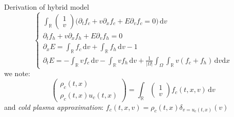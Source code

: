 \documentclass{beamer}
\begin{document}
\begin{frame}{Derivation of hybrid model}
  $$
    \begin{cases}
      \int_\mathbb{R} \begin{pmatrix}1\\v\end{pmatrix} \Big( \partial_t f_c + v\partial_xf_c + E\partial_v f_c = 0 \Big)\,\mathrm{d}v \\
      \partial_t f_h + v\partial_xf_h + E\partial_vf_h = 0 \\
      \partial_x E = \int_\mathbb{R}f_c\,\mathrm{d}v + \int_\mathbb{R}f_h\,\mathrm{d}v - 1 \\
      \partial_t E = - \int_\mathbb{R}vf_c\,\mathrm{d}v - \int_\mathbb{R}vf_h\,\mathrm{d}v + \frac{1}{|\Omega|}\int_\Omega\int_\mathbb{R} v(f_c+f_h)\,\mathrm{d}v\mathrm{d}x
    \end{cases}
  $$
  we note: $$
    \begin{pmatrix}
      \rho_c(t,x)\\ \rho_c(t,x)u_c(t,x)
    \end{pmatrix} = \int_\mathbb{R}\begin{pmatrix}1\\v\end{pmatrix}f_c(t,x,v)\,\mathrm{d}v
  $$
  and \emph{cold plasma approximation}: $f_c(t,x,v) = \rho_c(t,x)\delta_{v=u_c(t,x)}(v)$
\end{frame}
\end{document}
